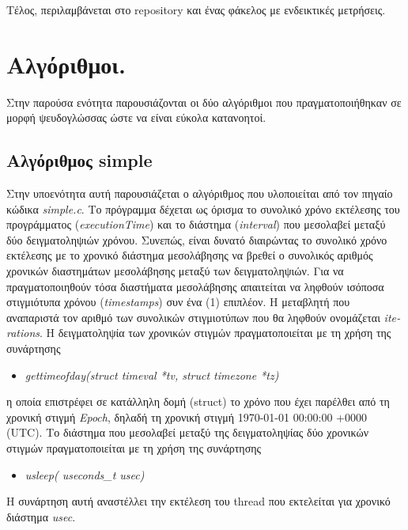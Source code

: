 \documentclass[12pt, a4paper]{article}
\begin{document}
\justify
Τέλος, περιλαμβάνεται στο repository και ένας φάκελος με ενδεικτικές μετρήσεις.

\section{Αλγόριθμοι.}
Στην παρούσα ενότητα παρουσιάζονται οι δύο αλγόριθμοι που πραγματοποιήθηκαν σε μορφή ψευδογλώσσας ώστε να είναι εύκολα κατανοητοί.

\subsection{Αλγόριθμος \textlatin{simple}}
Στην υποενότητα αυτή παρουσιάζεται ο αλγόριθμος που υλοποιείται από τον πηγαίο κώδικα \textlatin{\textit{simple.c}}. Το πρόγραμμα δέχεται ως όρισμα το συνολικό χρόνο εκτέλεσης του προγράμματος (\textlatin{\textit{executionTime}}) και το διάστημα (\textlatin{\textit{interval}}) που μεσολαβεί μεταξύ δύο δειγματοληψιών χρόνου. Συνεπώς, είναι δυνατό διαιρώντας το συνολικό χρόνο εκτέλεσης με το χρονικό διάστημα μεσολάβησης να βρεθεί ο συνολικός αριθμός χρονικών διαστημάτων μεσολάβησης μεταξύ των δειγματοληψιών. Για να πραγματοποιηθούν τόσα διαστήματα μεσολάβησης απαιτείται να ληφθούν ισόποσα στιγμιότυπα χρόνου (\textlatin{\textit{timestamps}}) συν ένα (1) επιπλέον. Η μεταβλητή που αναπαριστά τον αριθμό των συνολικών στιγμιοτύπων που θα ληφθούν ονομάζεται \textlatin{\textit{iterations}}.
\justify
Η δειγματοληψία των χρονικών στιγμών πραγματοποιείται με τη χρήση της συνάρτησης
\begin{itemize}
\item \textlatin{\textit{gettimeofday(struct timeval *tv,
    struct timezone *tz)}}\cite{manual}
\end{itemize}
η οποία επιστρέφει σε κατάλληλη δομή (\textlatin{struct}) το χρόνο που έχει παρέλθει από τη χρονική στιγμή \textlatin{\textit{Epoch}}, δηλαδή τη χρονική στιγμή 1970-01-01 00:00:00 +0000 (\textlatin{UTC}).
\justify
Το διάστημα που μεσολαβεί μεταξύ της δειγματοληψίας δύο χρονικών στιγμών πραγματοποιείται με τη χρήση της συνάρτησης
\begin{itemize}
    \item \textlatin{\textit{usleep( useconds\_t usec)}}\cite{manual}
\end{itemize}
Η συνάρτηση αυτή αναστέλλει την εκτέλεση του \textlatin{thread} που εκτελείται για χρονικό διάστημα \textlatin{\textit{usec}}.
\newline
\justify
\end{document}
